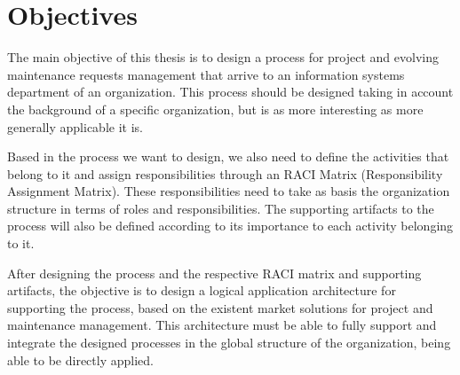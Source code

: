 
% 
% 

\section{Objectives}

The main objective of this thesis is to design a process for project and evolving maintenance requests management that arrive to an information systems department of an organization. This process should be designed taking in account the background of a specific organization, but is as more interesting as more generally applicable it is.\par
Based in the process we want to design, we also need to define the activities that belong to it and assign responsibilities through an RACI Matrix (Responsibility Assignment Matrix). These responsibilities need to take as basis the organization structure in terms of roles and responsibilities. The supporting artifacts to the process will also be defined according to its importance to each activity belonging to it.\par
After designing the process and the respective RACI matrix and supporting artifacts, the objective is to design a logical application architecture for supporting the process, based on the existent market solutions for project and maintenance management. This architecture must be able to fully support and integrate the designed processes in the global structure of the organization, being able to be directly applied.
